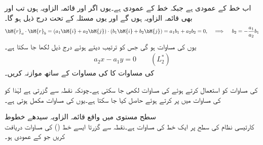 اب  خط  کے عمودی ہے جبکہ  خط  کے عمودی ہے۔یوں اگر  اور  قائمہ الزاویہ ہوں تب  اور  بھی قائمہ الزاویہ ہوں گے اور یوں مسئلہ   کے تحت درج ذیل ہو گا۔
\begin{align*}
\bM{r}_a\cdot \bM{r}_b=(a_1\bM{i}+a_2\bM{j})\cdot(b_1\bM{i}+b_2\bM{j})=a_1b_1+a_2b_2=0,\quad \implies \quad b_2=-\frac{a_1}{a_2}b_1
\end{align*}
یوں  کی مساوات  ہو گی جس کو ترتیب دیتے ہوئے درج ذیل لکھا جا سکتا ہے۔
\begin{align}
a_2x-a_1y=0\quad \quad (L_2^*)
\end{align}
  کی مساوات کا  کی مساوات  کے ساتھ موازنہ کریں۔

 کی مساوات  کو استعمال کرتے ہوئے  کی مساوات  لکھی جا سکتی ہے۔چونکہ  نقطہ  سے گزرتی ہے لہٰذا  کو  کی مساوات میں پر کرتے ہوئے  حاصل کیا جا سکتا ہے۔یوں  کی مساوات مکمل ہوتی ہے۔

\quad سطح مستوی میں واقع قائمہ الزاویہ سیدھے خطوط\\
کارتیسی نظام کی   سطح پر ایک خط   کی مساوات  ہے۔نقطہ  سے گزرتا ایسے خط () کی مساوات دریافت کریں جو  کے عمودی ہو۔

